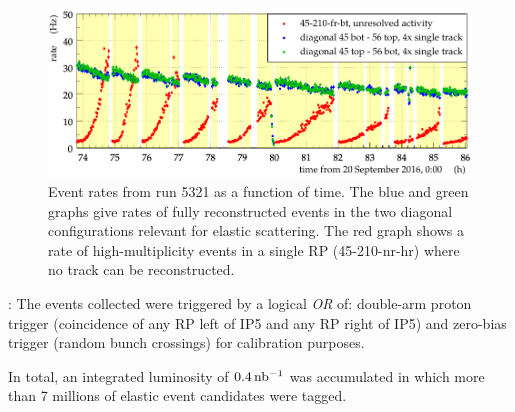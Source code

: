 \begin{figure}
\begin{center}
\includegraphics{fig/rates_vs_time.pdf}
\caption{%
Event rates from run 5321 as a function of time. The blue and green graphs give rates of fully reconstructed events in the two diagonal configurations relevant for elastic scattering. The red graph shows a rate of high-multiplicity events in a single RP (45-210-nr-hr) where no track can be reconstructed.
}
\label{fig:rates_vs_time}
\end{center}
\end{figure}

:
The events collected were triggered by a logical \textit{OR} of: double-arm proton trigger 
(coincidence of any RP left of IP5 and any RP right of IP5) and zero-bias trigger (random bunch crossings) for calibration purposes.

In total, an integrated luminosity of $0.4\,\rm nb^{-1}$ %
was accumulated in which more than 7 millions of elastic event candidates were tagged.
